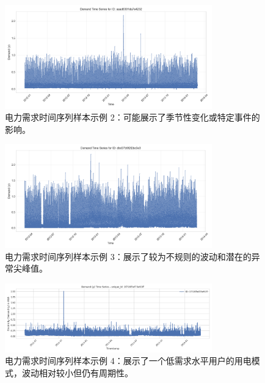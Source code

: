 \documentclass{article} %
\begin{document}
\begin{figure}[H]
    \centering
    \includegraphics[width=0.8\textwidth]{../plots/timeseries_sample_aaad8381da7e4232.png}
    \caption{电力需求时间序列样本示例 2：可能展示了季节性变化或特定事件的影响。} %
    \label{fig:timeseries_sample_2}
\end{figure}

\begin{figure}[H]
    \centering
    \includegraphics[width=0.8\textwidth]{../plots/timeseries_sample_dbd37b9f2f2bc0e3.png}
    \caption{电力需求时间序列样本示例 3：展示了较为不规则的波动和潜在的异常尖峰值。} %
    \label{fig:timeseries_sample_3}
\end{figure}

\begin{figure}[H]
    \centering
    \includegraphics[width=0.8\textwidth]{../plots/timeseries_sample_1f718f5ef73e91ff.png}
    \caption{电力需求时间序列样本示例 4：展示了一个低需求水平用户的用电模式，波动相对较小但仍有周期性。} %
    \label{fig:timeseries_sample_4}
\end{figure}
\end{document}

